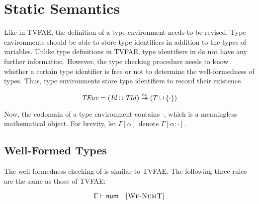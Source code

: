 


\section{Static Semantics}

Like in \textsf{TVFAE}, the definition of a type environment needs to be
revised. Type environments should be able to store type identifiers in
addition to the types of variables. Unlike type definitions in \textsf{TVFAE},
type identifiers in \lang do not have any further information. However, the type
checking procedure needs to know whether a certain type identifier is free or
not to determine the well-formedness of types. Thus, type environments store
type identifiers to record their existence.

\[
  \embox{TEnv}=(\embox{Id}\cup\embox{TId})\finto(T\cup\{\cdot\})
\]

Now, the codomain of a type environment contains $\cdot$, which is a
meaningless mathematical object. For brevity, let $\Gamma[\alpha]$ denote
$\Gamma[\alpha:\cdot]$.

\subsection{Well-Formed Types}

The well-formedness checking of \lang is similar to \textsf{TVFAE}.
The following three rules are the same as those of \textsf{TVFAE}:


\vspace{-1em}

\[
  \Gamma\vdash\textsf{num}
  \quad\textsc{[Wf-NumT]}
\]


